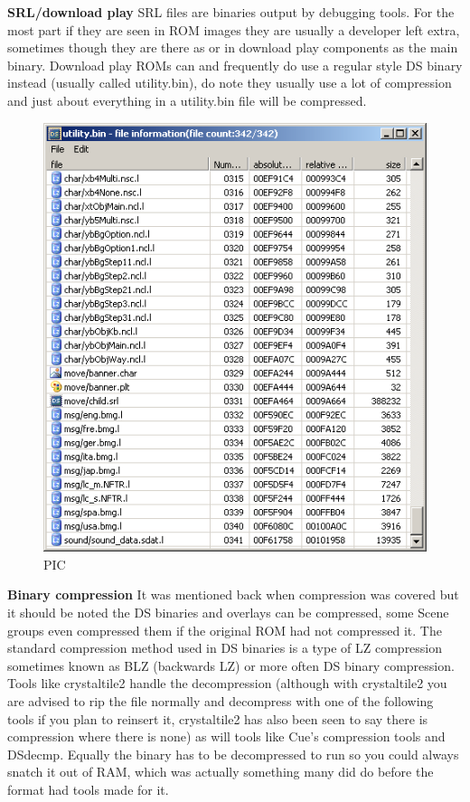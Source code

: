 \documentclass[
]{book}
\begin{document}
\textbf{SRL/download play} SRL files are binaries output by debugging tools. For the most part if they are seen in ROM images they are usually a developer left extra, sometimes though they are there as or in download play components as the main binary. Download play ROMs can and frequently do use a regular style DS binary instead (usually called utility.bin), do note they usually use a lot of compression and just about everything in a utility.bin file will be compressed.

\begin{figure}
\centering
\includegraphics{images/215_home_fast6191_romhackingguide_unrenamed_fil___riginal_borders_romhackguide_downloadplay_1.png}
\caption{PIC}
\end{figure}

\textbf{Binary compression} It was mentioned back when compression was covered but it should be noted the DS binaries and overlays can be compressed, some Scene groups even compressed them if the original ROM had not compressed it. The standard compression method used in DS binaries is a type of LZ compression sometimes known as BLZ (backwards LZ) or more often DS binary compression. Tools like crystaltile2 handle the decompression (although with crystaltile2 you are advised to rip the file normally and decompress with one of the following tools if you plan to reinsert it, crystaltile2 has also been seen to say there is compression where there is none) as will tools like Cue's compression tools and DSdecmp. Equally the binary has to be decompressed to run so you could always snatch it out of RAM, which was actually something many did do before the format had tools made for it.
\end{document}
